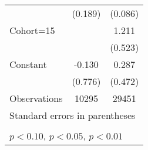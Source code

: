 \begin{table}[htbp]
\begin{tabular}{l*{2}{c}}
                    &     (0.189)         &     (0.086)         \\
\addlinespace
Cohort=15           &                     &       1.211\sym{**} \\
                    &                     &     (0.523)         \\
\addlinespace
Constant            &      -0.130         &       0.287         \\
                    &     (0.776)         &     (0.472)         \\
\midrule
Observations        &       10295         &       29451         \\
\bottomrule
\multicolumn{3}{l}{\footnotesize Standard errors in parentheses}\\
\multicolumn{3}{l}{\footnotesize }\\
\multicolumn{3}{l}{\footnotesize \sym{*} \(p<0.10\), \sym{**} \(p<0.05\), \sym{***} \(p<0.01\)}\\
\end{tabular}
\end{table}
